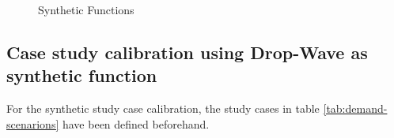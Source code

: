 \begin{figure}[htpb]
  \centering
    \qquad
  \caption{Synthetic Functions}
  \label{fig:spsavsfdsa-comparison}
\end{figure}

\subsection{Case study calibration using Drop-Wave as synthetic function}
For the synthetic study case calibration, the study cases in table \ref{tab:demand-scenarions} have been defined beforehand.

